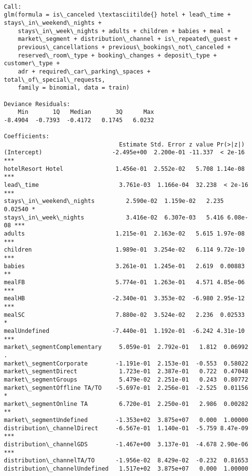 \documentclass[11pt]{article}
\begin{document}
    \begin{Verbatim}[commandchars=\\\{\}]

Call:
glm(formula = is\_canceled \textasciitilde{} hotel + lead\_time + stays\_in\_weekend\_nights + 
    stays\_in\_week\_nights + adults + children + babies + meal + 
    market\_segment + distribution\_channel + is\_repeated\_guest + 
    previous\_cancellations + previous\_bookings\_not\_canceled + 
    reserved\_room\_type + booking\_changes + deposit\_type + customer\_type + 
    adr + required\_car\_parking\_spaces + total\_of\_special\_requests, 
    family = binomial, data = train)

Deviance Residuals: 
    Min       1Q   Median       3Q      Max  
-8.4904  -0.7393  -0.4172   0.1745   6.0232  

Coefficients:
                                 Estimate Std. Error z value Pr(>|z|)    
(Intercept)                    -2.495e+00  2.200e-01 -11.337  < 2e-16 ***
hotelResort Hotel               1.456e-01  2.552e-02   5.708 1.14e-08 ***
lead\_time                       3.761e-03  1.166e-04  32.238  < 2e-16 ***
stays\_in\_weekend\_nights         2.590e-02  1.159e-02   2.235  0.02540 *  
stays\_in\_week\_nights            3.416e-02  6.307e-03   5.416 6.08e-08 ***
adults                          1.215e-01  2.163e-02   5.615 1.97e-08 ***
children                        1.989e-01  3.254e-02   6.114 9.72e-10 ***
babies                          3.261e-01  1.245e-01   2.619  0.00883 ** 
mealFB                          5.774e-01  1.263e-01   4.571 4.85e-06 ***
mealHB                         -2.340e-01  3.353e-02  -6.980 2.95e-12 ***
mealSC                          7.880e-02  3.524e-02   2.236  0.02533 *  
mealUndefined                  -7.440e-01  1.192e-01  -6.242 4.31e-10 ***
market\_segmentComplementary     5.059e-01  2.792e-01   1.812  0.06992 .  
market\_segmentCorporate        -1.191e-01  2.153e-01  -0.553  0.58022    
market\_segmentDirect            1.723e-01  2.387e-01   0.722  0.47048    
market\_segmentGroups            5.479e-02  2.251e-01   0.243  0.80772    
market\_segmentOffline TA/TO    -5.697e-01  2.256e-01  -2.525  0.01156 *  
market\_segmentOnline TA         6.720e-01  2.250e-01   2.986  0.00282 ** 
market\_segmentUndefined        -1.353e+02  3.875e+07   0.000  1.00000    
distribution\_channelDirect     -6.567e-01  1.140e-01  -5.759 8.47e-09 ***
distribution\_channelGDS        -1.467e+00  3.137e-01  -4.678 2.90e-06 ***
distribution\_channelTA/TO      -1.956e-02  8.429e-02  -0.232  0.81653    
distribution\_channelUndefined   1.517e+02  3.875e+07   0.000  1.00000    

\end{Verbatim}
\end{document}
